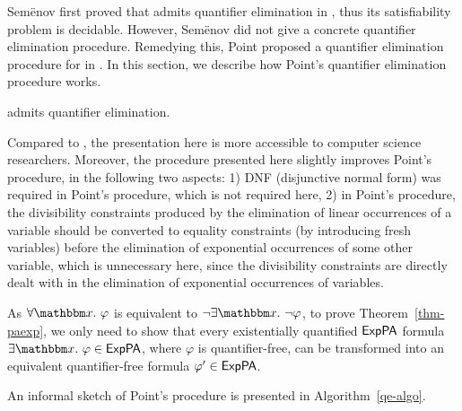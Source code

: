 
Semënov first proved that  {\paexp} admits quantifier elimination in \cite{Semenov84}, thus its satisfiability problem is decidable. However, Semënov did not give a concrete quantifier elimination procedure. Remedying this, Point proposed a quantifier elimination procedure for {\paexp} in \cite{Point86}. In this section, we describe how Point's quantifier elimination procedure works. 

\vspace*{-3mm}

\begin{theorem}
\label{thm-paexp}
{\paexp} admits quantifier elimination. 
\end{theorem}
\vspace*{-3mm}

Compared to \cite{Point86}, the presentation here is more accessible to computer science researchers. Moreover, the procedure presented here slightly improves Point's procedure, in the following two aspects: 1) DNF (disjunctive normal form) was required in Point's procedure, which is not required here, 2) in Point's procedure, the divisibility constraints produced by the elimination of linear occurrences of a variable should be converted to equality constraints (by introducing fresh variables) before the elimination of exponential occurrences of some other variable, which is unnecessary here, since the divisibility constraints are directly dealt with in the elimination of exponential occurrences of variables. 

As $\forall \ivarx. \ \varphi$ is equivalent to $\neg \exists \ivarx. \ \neg \varphi$, to prove Theorem~\ref{thm-paexp}, we only need to show that every existentially quantified ${\sf ExpPA}$ formula $\exists \ivarx.\ \varphi \in \paexp$, where $\varphi$ is quantifier-free, can be transformed into an equivalent quantifier-free formula $\varphi' \in {\sf ExpPA}$. 

An informal sketch of Point's procedure is presented in Algorithm~\ref{qe-algo}.


